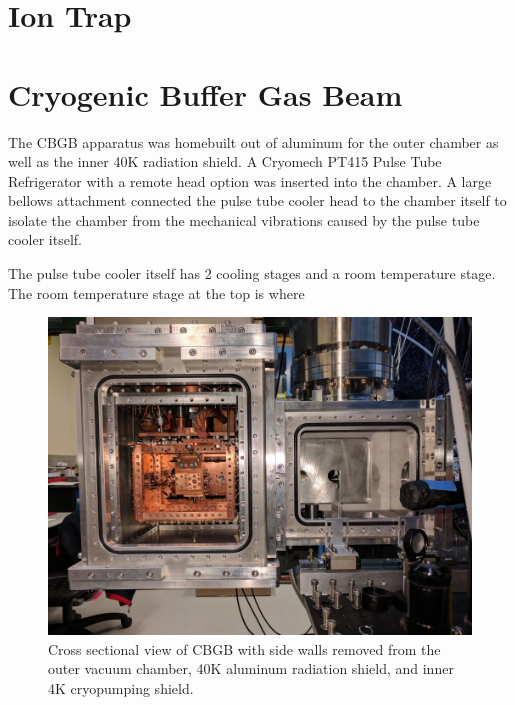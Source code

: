 \section{Ion Trap}

\section{Cryogenic Buffer Gas Beam}

The CBGB apparatus was homebuilt out of aluminum for the outer chamber as well as the inner 40K radiation shield. A Cryomech PT415 Pulse Tube Refrigerator with a remote head option was inserted into the chamber. A large bellows attachment connected the pulse tube cooler head to the chamber itself to isolate the chamber from the mechanical vibrations caused by the pulse tube cooler itself.

The pulse tube cooler itself has 2 cooling stages and a room temperature stage. The room temperature stage at the top is where 

\begin{figure}[H]
\centering
\includegraphics[width=1\textwidth]{images/apparatus_cross_section.jpg}
\caption{Cross sectional view of CBGB with side walls removed from the outer vacuum chamber, 40K aluminum radiation shield, and inner 4K cryopumping shield.}
\label{f: chamber}
\end{figure}


